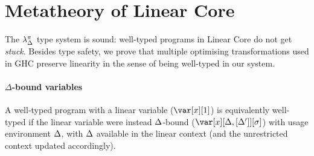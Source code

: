 \documentclass[acmsmall,review,anonymous,screen]{acmart}
\begin{document}
\section{Metatheory of Linear Core\label{sec:main:metatheory}}

The $\lambda^\pi_\Delta$ type system is sound: well-typed programs in Linear Core do not
get \emph{stuck}. Besides type safety, we
prove that multiple optimising transformations used in GHC preserve
linearity in the sense of being well-typed in our system.
%



\renewcommand{\DeltaLinearRelationLemma}{
\begin{restatable}[$\Delta$-bound to Linear]{lemma}{deltaone}\label{lem:deltaone}
If $\G,\x[\irr{\D}]; \irr{\D},\D' \vdash e : \vp$ 
then $\G[x/\irr{\D}]; \D',\xl \vdash e :\vp$.
\end{restatable}
}

\renewcommand{\LinearDeltaRelationLemma}{
  \begin{restatable}[Linear to $\Delta$-bound]{lemma}{onedelta}\label{lem:onedelta}
If $\G; \D',\xl \vdash e :\vp$
then $\G[\D/x],\xD; \D,\D' \vdash e : \vp$ ($\Delta$ fresh).
\end{restatable}
}

\renewcommand{\DeltaUnrestrictedRelationLemma}{
\begin{restatable}[Unrestricted and $\Delta$-bound]{lemma}{undelta}\label{lem:undelta}
$\G,\xo; \D \vdash e : \vp$ iff $\G,\x[\cdot]; \D \vdash e : \vp$
\end{restatable}
}

\paragraph{$\Delta$-bound variables} %
A well-typed program with a linear variable ($\xl$) is equivalently
well-typed if the linear variable were instead $\Delta$-bound ($\xD$) with
usage environment $\Delta$, with $\Delta$ available in the linear context (and the unrestricted context updated accordingly).
\end{document}

